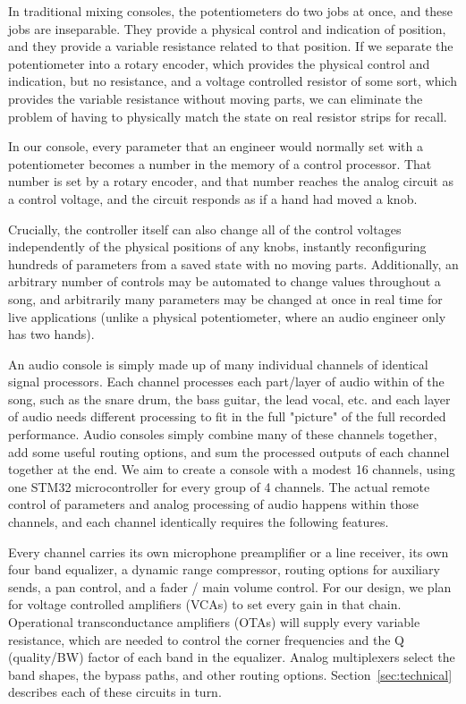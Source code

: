 \documentclass[11pt, letterpaper,titlepage]{article}
\begin{document}
In traditional mixing consoles, the potentiometers do two jobs at once, and these jobs are inseparable. They provide a physical control and indication of position, and they provide a variable resistance related to that position. If we separate the potentiometer into a rotary encoder, which provides the physical control and indication, but no resistance, and a voltage controlled resistor of some sort, which provides the variable resistance without moving parts, we can eliminate the problem of having to physically match the state on real resistor strips for recall.


In our console, every parameter that an engineer would normally set with a potentiometer becomes a number in the memory of a control processor. That number is set by a rotary encoder, and that number reaches the analog
circuit as a control voltage, and the circuit responds as if a hand had moved a
knob.

Crucially, the controller itself can also change all of the control voltages independently of the physical positions of any knobs, instantly reconfiguring hundreds of parameters from a saved state with no moving parts. Additionally, an arbitrary number of controls may be automated to change values throughout a song, and arbitrarily many parameters may be changed at once in real time for live applications (unlike a physical potentiometer, where an audio engineer only has two hands).

An audio console is simply made up of many individual channels of identical signal processors. Each channel processes each part/layer of audio within of the song, such as the snare drum, the bass guitar, the lead vocal, etc. and each layer of audio needs different processing to fit in the full "picture" of the full recorded performance. Audio consoles simply combine many of these channels together, add some useful routing options, and sum the processed outputs of each channel together at the end. We aim to create a console with a modest 16 channels, using one STM32 microcontroller for every group of 4 channels. The actual remote control of parameters and analog processing of audio happens within those channels, and each channel identically requires the following features.

Every channel carries its own microphone preamplifier or a line receiver, its own four band
equalizer, a dynamic range compressor, routing options for auxiliary sends, a pan control, and a fader / main volume control. For our design, we plan for voltage
controlled amplifiers (VCAs) to set every gain in that chain. Operational transconductance
amplifiers (OTAs) will supply every variable resistance, which are needed to control the corner frequencies
and the Q (quality/BW) factor of each band in the equalizer. Analog multiplexers select the band shapes, the
bypass paths, and other routing options. Section~\ref{sec:technical}
describes each of these circuits in turn.
\end{document}
